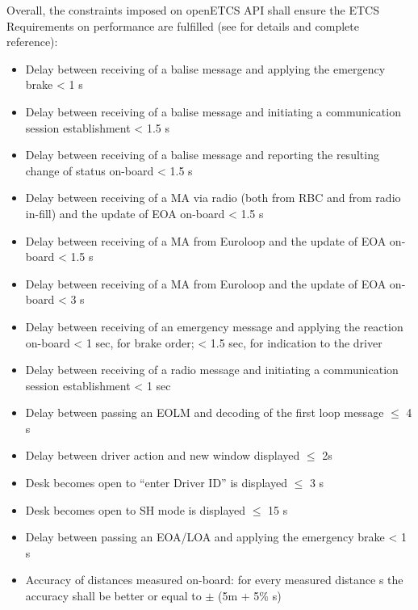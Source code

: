 Overall, the constraints imposed on openETCS API shall ensure the ETCS
Requirements on performance are fulfilled (see \cite{subset-041} for
details and complete reference):
\begin{itemize}
\item Delay between receiving of a balise message and applying the
  emergency brake < 1 s

\item Delay between receiving of a balise message and initiating a
  communication session establishment < 1.5 s

\item Delay between receiving of a balise message and reporting the
  resulting change of status on-board < 1.5 s

\item Delay between receiving of a MA via radio (both from RBC and
  from radio in-fill) and the update of EOA on-board < 1.5 s

\item Delay between receiving of a MA from Euroloop and the update of
  EOA on-board < 1.5 s

\item Delay between receiving of a MA from Euroloop and the update of
  EOA on-board < 3 s

\item Delay between receiving of an emergency message and applying the
  reaction on-board < 1 sec, for brake order; < 1.5 sec, for
  indication to the driver

\item Delay between receiving of a radio message and initiating a
  communication session establishment < 1 sec

\item Delay between passing an EOLM and decoding of the first loop
  message $\le$ 4 s

\item Delay between driver action and new window displayed $\le$ 2s

\item Desk becomes open to ``enter Driver ID'' is displayed $\le$ 3 s

\item Desk becomes open to SH mode is displayed $\le$ 15 s

\item Delay between passing an EOA/LOA and applying the emergency
  brake < 1 s

\item Accuracy of distances measured on-board: for every measured
  distance s the accuracy shall be better or equal to $\pm$ (5m + 5\% s)


\end{itemize}
